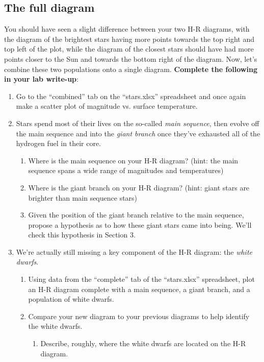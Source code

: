\documentclass[11pt]{article}
\begin{document}
\subsection{The full diagram}
You should have seen a slight difference between your two H-R diagrams, with the diagram of the brightest stars having more points towards the top right and top left of the plot, while the diagram of the closest stars should have had more points closer to the Sun and towards the bottom right of the diagram. Now, let's combine these two populations onto a single diagram. \textbf{Complete the following in your lab write-up}:
\begin{enumerate}
    \item Go to the ``combined'' tab on the ``stars.xlsx'' spreadsheet and once again make a scatter plot of magnitude vs. surface temperature.
    
    \item Stars spend most of their lives on the so-called \emph{main sequence}, then evolve off the main sequence and into the \emph{giant branch} once they've exhausted all of the hydrogen fuel in their core.
    \begin{enumerate}
        \item Where is the main sequence on your H-R diagram? (hint: the main sequence spans a wide range of magnitudes and temperatures)
        
        \item Where is the giant branch on your H-R diagram? (hint: giant stars are brighter than main sequence stars)
        
        \item Given the position of the giant branch relative to the main sequence, propose a hypothesis as to how these giant stars came into being. We'll check this hypothesis in Section 3.
    
    \end{enumerate}
    
    \item We're actually still missing a key component of the H-R diagram: the \emph{white dwarfs}.
    \begin{enumerate}
        \item Using data from the ``complete'' tab of the ``stars.xlsx'' spreadsheet, plot an H-R diagram complete with a main sequence, a giant branch, and a population of white dwarfs.
        
        \item Compare your new diagram to your previous diagrams to help identify the white dwarfs.
        \begin{enumerate}
            \item Describe, roughly, where the white dwarfs are located on the H-R diagram. 
            

\end{enumerate}
\end{enumerate}
\end{enumerate}
\end{document}
